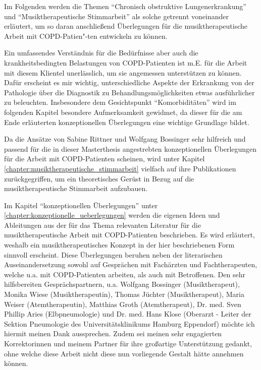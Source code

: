 Im Folgenden werden die Themen "`Chronisch obstruktive Lungenerkrankung"' und "`Musiktherapeutische Stimmarbeit"' als solche getrennt voneinander erläutert, um so daran anschließend Überlegungen für die musiktherapeutische Arbeit mit COPD-Patien"-ten entwickeln zu können.

Ein umfassendes Verständnis für die Bedürfnisse aber auch die krankheitsbedingten Belastungen von COPD-Patienten ist m.E. für die Arbeit mit diesem Klientel unerlässlich, um sie angemessen unterstützen zu können. Dafür erscheint es mir wichtig, unterschiedliche Aspekte der Erkrankung von der Pathologie über die Diagnostik zu Behandlungsmöglichkeiten etwas ausführlicher zu beleuchten. Insbesondere dem Gesichtspunkt "`Komorbiditäten"' wird im folgenden Kapitel besondere Aufmerksamkeit gewidmet, da dieser für die am Ende erläuterten konzeptionellen Überlegungen eine wichtige Grundlage bildet.

Da die Ansätze von Sabine Rittner und Wolfgang Bossinger sehr hilfreich und passend für die in dieser Masterthesis angestrebten konzeptionellen Überlegungen für die Arbeit mit COPD-Patienten scheinen, wird unter Kapitel  \ref{chapter:musiktherapeutische_stimmarbeit} vielfach auf ihre Publikationen zurückgegriffen, um ein theoretisches Gerüst in Bezug auf die musiktherapeutische Stimmarbeit aufzubauen.

Im Kapitel "`konzeptionellen Überlegungen"' unter \ref{chapter:konzeptionelle_ueberlegungen} werden die eigenen Ideen und Ableitungen aus der für das Thema relevanten Literatur für die musiktherapeutische Arbeit mit COPD-Patienten beschrieben. Es wird erläutert, weshalb ein musiktherapeutisches Konzept in der hier beschriebenen Form sinnvoll erscheint. Diese Überlegungen beruhen neben der literarischen Auseinandersetzung sowohl auf Gesprächen mit Fachärzten und Fachtherapeuten, welche u.a. mit COPD-Patienten arbeiten, als auch mit Betroffenen. Den sehr hilfsbereiten Gesprächspartnern, u.a. Wolfgang Bossinger (Musiktherapeut), Monika Wiese (Musiktherapeutin), Thomas Jüchter (Musiktherapeut), Maria Weiser (Atemtherapeutin), Matthias Groth (Atemtherapeut), Dr. med. Sven Phillip Aries (Elbpneumologie) und Dr. med. Hans Klose (Oberarzt - Leiter der Sektion Pneumologie des Universitätsklinikums Hamburg Eppendorf) möchte ich hiermit meinen Dank aussprechen. Zudem sei meinen sehr engagierten Korrektorinnen und meinem Partner für ihre großartige Unterstützung gedankt, ohne welche diese Arbeit nicht diese nun vorliegende Gestalt hätte annehmen können.

\newpage\thispagestyle{empty}